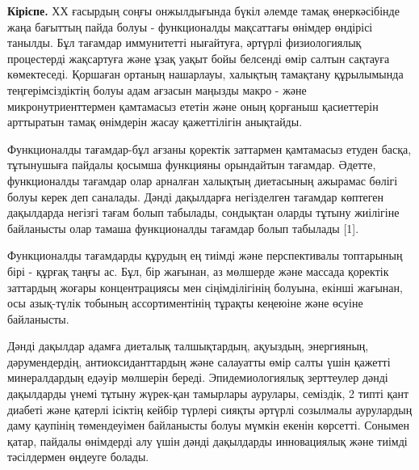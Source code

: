 \begin{multicols}{2}
{\bfseries Кіріспе.} ХХ ғасырдың соңғы онжылдығында бүкіл әлемде тамақ
өнеркәсібінде жаңа бағыттың пайда болуы - функционалды мақсаттағы
өнімдер өндірісі танылды. Бұл тағамдар иммунитетті нығайтуға, әртүрлі
физиологиялық процестерді жақсартуға және ұзақ уақыт бойы белсенді өмір
салтын сақтауға көмектеседі. Қоршаған ортаның нашарлауы, халықтың
тамақтану құрылымында теңгерімсіздіктің болуы адам ағзасын маңызды макро
- және микронутриенттермен қамтамасыз ететін және оның қорғаныш
қасиеттерін арттыратын тамақ өнімдерін жасау қажеттілігін анықтайды.

Функционалды тағамдар-бұл ағзаны қоректік заттармен қамтамасыз етуден
басқа, тұтынушыға пайдалы қосымша функцияны орындайтын тағамдар. Әдетте,
функционалды тағамдар олар арналған халықтың диетасының ажырамас бөлігі
болуы керек деп саналады. Дәнді дақылдарға негізделген тағамдар көптеген
дақылдарда негізгі тағам болып табылады, сондықтан оларды тұтыну
жиілігіне байланысты олар тамаша функционалды тағамдар болып табылады
{[}1{]}.

Функционалды тағамдарды құрудың ең тиімді және перспективалы топтарының
бірі - құрғақ таңғы ас. Бұл, бір жағынан, аз мөлшерде және массада
қоректік заттардың жоғары концентрациясы мен сіңімділігінің болуына,
екінші жағынан, осы азық-түлік тобының ассортиментінің тұрақты кеңеюіне
және өсуіне байланысты.

Дәнді дақылдар адамға диеталық талшықтардың, ақуыздың, энергияның,
дәрумендердің, антиоксиданттардың және салауатты өмір салты үшін қажетті
минералдардың едәуір мөлшерін береді. Эпидемиологиялық зерттеулер дәнді
дақылдарды үнемі тұтыну жүрек-қан тамырлары аурулары, семіздік, 2 типті
қант диабеті және қатерлі ісіктің кейбір түрлері сияқты әртүрлі
созылмалы аурулардың даму қаупінің төмендеуімен байланысты болуы мүмкін
екенін көрсетті. Сонымен қатар, пайдалы өнімдерді алу үшін дәнді
дақылдарды инновациялық және тиімді тәсілдермен өңдеуге болады.


\end{multicols}
